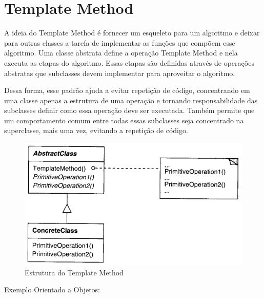 \section{Template Method}

A ideia do Template Method é fornecer um esqueleto para um algoritmo 
e deixar para outras classes a tarefa de implementar as funções que 
compõem esse algoritmo. Uma classe abstrata define a operação Template 
Method e nela executa as etapas do algoritmo. Essas etapas são definidas 
através de operações abstratas que subclasses devem implementar para 
aproveitar o algoritmo.

Dessa forma, esse padrão ajuda a evitar repetição de código, concentrando 
em uma classe apenas a estrutura de uma operação e tornando responsabilidade 
das subclasses definir como essa operação deve ser executada. Também permite 
que um comportamento comum entre todas essas subclasses seja concentrado 
na superclasse, mais uma vez, evitando a repetição de código.

\begin{figure}[htb]
	\caption{\label{tpmethod_struct}Estrutura do Template Method}
	\begin{center}
	    \includegraphics[scale=0.5]{5_padroes-contexto-funcional/5.3_comportamentais/5.3.10_template-method/diagram.png}
	\end{center}
\end{figure}

Exemplo Orientado a Objetos:

